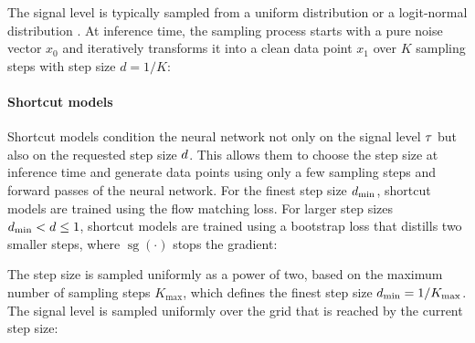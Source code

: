 \documentclass[11pt]{article}
\begin{document}
The signal level is typically sampled from a uniform distribution or a logit-normal distribution \citep{sd3}.
At inference time, the sampling process starts with a pure noise vector $x_0$ and iteratively transforms it into a clean data point $x_1$ over $K$ sampling steps with step size $d = 1/K$:


\paragraph{Shortcut models}

Shortcut models \citep{shortcut} condition the neural network not only on the signal level $\tau$ but also on the requested step size $d$.
This allows them to choose the step size at inference time and generate data points using only a few sampling steps and forward passes of the neural network.
For the finest step size $d_\mathrm{min}$, shortcut models are trained using the flow matching loss.
For larger step sizes $d_\mathrm{min}<d \leq 1$, shortcut models are trained using a bootstrap loss that distills two smaller steps, where $\operatorname{sg}(\cdot)$ stops the gradient:


The step size is sampled uniformly as a power of two, based on the maximum number of sampling steps $K_\mathrm{max}$, which defines the finest step size $d_\mathrm{min}=1/K_\mathrm{max}$. The signal level is sampled uniformly over the grid that is reached by the current step size:
\end{document}
